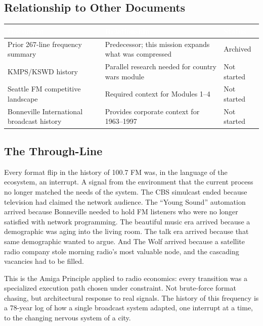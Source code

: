 \documentclass[11pt,letterpaper]{article}
\newcommand{\tableheader}[1]{\textbf{\sffamily\textcolor{white}{#1}}}
\begin{document}
\subsection{Relationship to Other Documents}

\begin{center}
\begin{tabularx}{\textwidth}{L{3.5cm}XC{2cm}}
\toprule
{}
\tableheader{Document} & \tableheader{Relationship} & \tableheader{Status} \\
\midrule
Prior 267-line frequency summary & Predecessor; this mission expands what was compressed & Archived \\
KMPS/KSWD history & Parallel research needed for country wars module & Not started \\
Seattle FM competitive landscape & Required context for Modules 1--4 & Not started \\
Bonneville International broadcast history & Provides corporate context for 1963--1997 & Not started \\
\bottomrule
\end{tabularx}
\end{center}

\subsection{The Through-Line}

Every format flip in the history of 100.7 FM was, in the language of the ecosystem, an interrupt. A signal from the environment that the current process no longer matched the needs of the system. The CBS simulcast ended because television had claimed the network audience. The ``Young Sound'' automation arrived because Bonneville needed to hold FM listeners who were no longer satisfied with network programming. The beautiful music era arrived because a demographic was aging into the living room. The talk era arrived because that same demographic wanted to argue. And The Wolf arrived because a satellite radio company stole morning radio's most valuable node, and the cascading vacancies had to be filled.

This is the Amiga Principle applied to radio economics: every transition was a specialized execution path chosen under constraint. Not brute-force format chasing, but architectural response to real signals. The history of this frequency is a 78-year log of how a single broadcast system adapted, one interrupt at a time, to the changing nervous system of a city.
\end{document}

